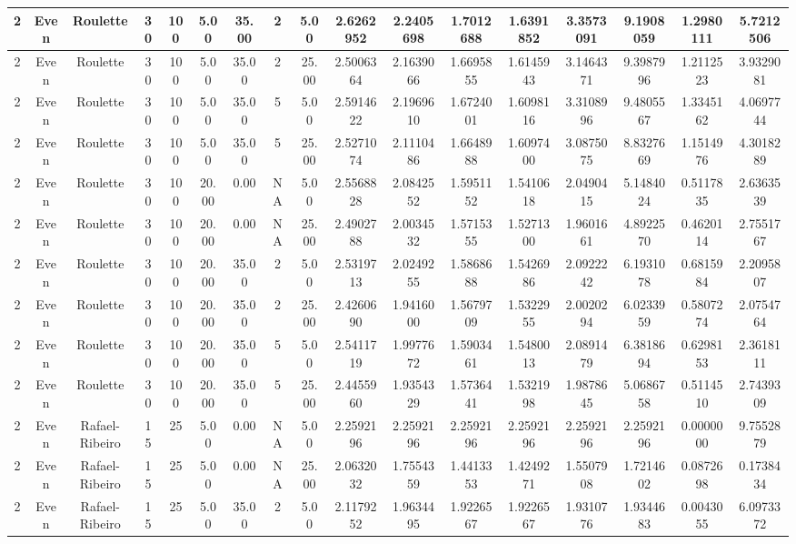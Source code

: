 \documentclass[a4paper]{article}
\begin{document}
\begin{center}
\begin{tabular}{ | c | c | c | c | c | c | c | c | c | c | c | c | c | c | c | c | c | }
		\hline
		2	&	Even	&	Roulette	&	30	&	100	&	5.00	&	35.00	&	2	&	5.00	&	2.6262952	&	2.2405698	&	1.7012688	&	1.6391852	&	3.3573091	&	9.1908059	&	1.2980111	&	5.7212506 \\
		\hline
		2	&	Even	&	Roulette	&	30	&	100	&	5.00	&	35.00	&	2	&	25.00	&	2.5006364	&	2.1639066	&	1.6695855	&	1.6145943	&	3.1464371	&	9.3987996	&	1.2112523	&	3.9329081 \\
		\hline
		2	&	Even	&	Roulette	&	30	&	100	&	5.00	&	35.00	&	5	&	5.00	&	2.5914622	&	2.1969610	&	1.6724001	&	1.6098116	&	3.3108996	&	9.4805567	&	1.3345162	&	4.0697744 \\
		\hline
		2	&	Even	&	Roulette	&	30	&	100	&	5.00	&	35.00	&	5	&	25.00	&	2.5271074	&	2.1110486	&	1.6648988	&	1.6097400	&	3.0875075	&	8.8327669	&	1.1514976	&	4.3018289 \\
		\hline
		2	&	Even	&	Roulette	&	30	&	100	&	20.00	&	0.00	&	NA	&	5.00	&	2.5568828	&	2.0842552	&	1.5951152	&	1.5410618	&	2.0490415	&	5.1484024	&	0.5117835	&	2.6363539 \\
		\hline
		2	&	Even	&	Roulette	&	30	&	100	&	20.00	&	0.00	&	NA	&	25.00	&	2.4902788	&	2.0034532	&	1.5715355	&	1.5271300	&	1.9601661	&	4.8922570	&	0.4620114	&	2.7551767 \\
		\hline
		2	&	Even	&	Roulette	&	30	&	100	&	20.00	&	35.00	&	2	&	5.00	&	2.5319713	&	2.0249255	&	1.5868688	&	1.5426986	&	2.0922242	&	6.1931078	&	0.6815984	&	2.2095807 \\
		\hline
		2	&	Even	&	Roulette	&	30	&	100	&	20.00	&	35.00	&	2	&	25.00	&	2.4260690	&	1.9416000	&	1.5679709	&	1.5322955	&	2.0020294	&	6.0233959	&	0.5807274	&	2.0754764 \\
		\hline
		2	&	Even	&	Roulette	&	30	&	100	&	20.00	&	35.00	&	5	&	5.00	&	2.5411719	&	1.9977672	&	1.5903461	&	1.5480013	&	2.0891479	&	6.3818694	&	0.6298153	&	2.3618111 \\
		\hline
		2	&	Even	&	Roulette	&	30	&	100	&	20.00	&	35.00	&	5	&	25.00	&	2.4455960	&	1.9354329	&	1.5736441	&	1.5321998	&	1.9878645	&	5.0686758	&	0.5114510	&	2.7439309 \\
		\hline
		2	&	Even	&	Rafael-Ribeiro	&	15	&	25	&	5.00	&	0.00	&	NA	&	5.00	&	2.2592196	&	2.2592196	&	2.2592196	&	2.2592196	&	2.2592196	&	2.2592196	&	0.0000000	&	9.7552879 \\
		\hline
		2	&	Even	&	Rafael-Ribeiro	&	15	&	25	&	5.00	&	0.00	&	NA	&	25.00	&	2.0632032	&	1.7554359	&	1.4413353	&	1.4249271	&	1.5507908	&	1.7214602	&	0.0872698	&	0.1738434 \\
		\hline
		2	&	Even	&	Rafael-Ribeiro	&	15	&	25	&	5.00	&	35.00	&	2	&	5.00	&	2.1179252	&	1.9634495	&	1.9226567	&	1.9226567	&	1.9310776	&	1.9344683	&	0.0043055	&	6.0973372 \\

\end{tabular}
\end{center}
\end{document}
